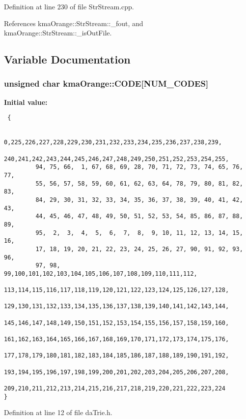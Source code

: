 Definition at line 230 of file StrStream.cpp.

References kmaOrange::StrStream::\_\-fout, and kmaOrange::StrStream::\_\-isOutFile.

\subsection{Variable Documentation}
\hypertarget{namespacekmaOrange_50d4eae59f79db6fa6e1a81992889687}{
\subsubsection[{CODE}]{\setlength{\rightskip}{0pt plus 5cm}unsigned char {\bf kmaOrange::CODE}\mbox{[}{\bf NUM\_\-CODES}\mbox{]}}}
\label{namespacekmaOrange_50d4eae59f79db6fa6e1a81992889687}


\textbf{Initial value:}

\begin{Code}\begin{verbatim} {

          0,225,226,227,228,229,230,231,232,233,234,235,236,237,238,239, 
        240,241,242,243,244,245,246,247,248,249,250,251,252,253,254,255, 
         94, 75, 66,  1, 67, 68, 69, 28, 70, 71, 72, 73, 74, 65, 76, 77, 
         55, 56, 57, 58, 59, 60, 61, 62, 63, 64, 78, 79, 80, 81, 82, 83, 
         84, 29, 30, 31, 32, 33, 34, 35, 36, 37, 38, 39, 40, 41, 42, 43, 
         44, 45, 46, 47, 48, 49, 50, 51, 52, 53, 54, 85, 86, 87, 88, 89, 
         95,  2,  3,  4,  5,  6,  7,  8,  9, 10, 11, 12, 13, 14, 15, 16, 
         17, 18, 19, 20, 21, 22, 23, 24, 25, 26, 27, 90, 91, 92, 93, 96, 
         97, 98, 99,100,101,102,103,104,105,106,107,108,109,110,111,112, 
        113,114,115,116,117,118,119,120,121,122,123,124,125,126,127,128, 
        129,130,131,132,133,134,135,136,137,138,139,140,141,142,143,144, 
        145,146,147,148,149,150,151,152,153,154,155,156,157,158,159,160, 
        161,162,163,164,165,166,167,168,169,170,171,172,173,174,175,176, 
        177,178,179,180,181,182,183,184,185,186,187,188,189,190,191,192, 
        193,194,195,196,197,198,199,200,201,202,203,204,205,206,207,208, 
        209,210,211,212,213,214,215,216,217,218,219,220,221,222,223,224  
}
\end{verbatim}
\end{Code}


Definition at line 12 of file daTrie.h.

